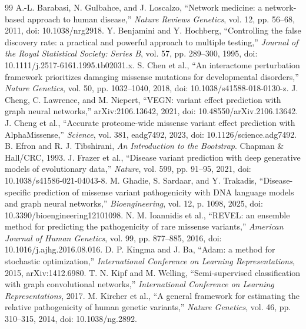 \documentclass[conference]{IEEEtran}
\begin{document}
\begin{thebibliography}{99}
 A.-L. Barabasi, N. Gulbahce, and J. Loscalzo, ``Network medicine: a network-based approach to human disease,'' \emph{Nature Reviews Genetics}, vol. 12, pp. 56--68, 2011, doi: 10.1038/nrg2918.
 Y. Benjamini and Y. Hochberg, ``Controlling the false discovery rate: a practical and powerful approach to multiple testing,'' \emph{Journal of the Royal Statistical Society: Series B}, vol. 57, pp. 289--300, 1995, doi: 10.1111/j.2517-6161.1995.tb02031.x.
 S. Chen et al., ``An interactome perturbation framework prioritizes damaging missense mutations for developmental disorders,'' \emph{Nature Genetics}, vol. 50, pp. 1032--1040, 2018, doi: 10.1038/s41588-018-0130-z.
 J. Cheng, C. Lawrence, and M. Niepert, ``VEGN: variant effect prediction with graph neural networks,'' arXiv:2106.13642, 2021, doi: 10.48550/arXiv.2106.13642.
 J. Cheng et al., ``Accurate proteome-wide missense variant effect prediction with AlphaMissense,'' \emph{Science}, vol. 381, eadg7492, 2023, doi: 10.1126/science.adg7492.
 B. Efron and R. J. Tibshirani, \emph{An Introduction to the Bootstrap}. Chapman \& Hall/CRC, 1993.
 J. Frazer et al., ``Disease variant prediction with deep generative models of evolutionary data,'' \emph{Nature}, vol. 599, pp. 91--95, 2021, doi: 10.1038/s41586-021-04043-8.
 M. Ghadie, S. Sardaar, and Y. Trakadis, ``Disease-specific prediction of missense variant pathogenicity with DNA language models and graph neural networks,'' \emph{Bioengineering}, vol. 12, p. 1098, 2025, doi: 10.3390/bioengineering12101098.
 N. M. Ioannidis et al., ``REVEL: an ensemble method for predicting the pathogenicity of rare missense variants,'' \emph{American Journal of Human Genetics}, vol. 99, pp. 877--885, 2016, doi: 10.1016/j.ajhg.2016.08.016.
 D. P. Kingma and J. Ba, ``Adam: a method for stochastic optimization,'' \emph{International Conference on Learning Representations}, 2015, arXiv:1412.6980.
 T. N. Kipf and M. Welling, ``Semi-supervised classification with graph convolutional networks,'' \emph{International Conference on Learning Representations}, 2017.
 M. Kircher et al., ``A general framework for estimating the relative pathogenicity of human genetic variants,'' \emph{Nature Genetics}, vol. 46, pp. 310--315, 2014, doi: 10.1038/ng.2892.

\end{thebibliography}
\end{document}
